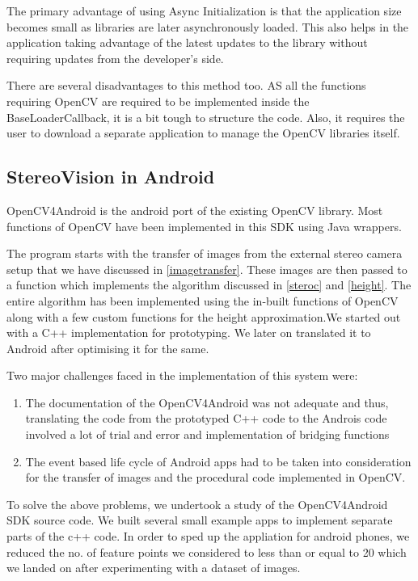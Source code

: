 \documentclass[11pt]{report}
\begin{document}
The primary advantage of using Async Initialization is that the application size becomes small as libraries are later asynchronously loaded. This also helps in the application taking advantage of the latest updates to the library without requiring updates from the developer's side.

There are several disadvantages to this method too. AS all the functions requiring OpenCV are required to be implemented inside the BaseLoaderCallback, it is a bit tough to structure the code. Also, it requires the user to download a separate application to manage the OpenCV libraries itself.

\subsection{StereoVision in Android}

OpenCV4Android is the android port of the existing OpenCV library. Most functions of OpenCV have been implemented in this SDK using Java wrappers. 

The program starts with the transfer of images from the external stereo camera setup that we have discussed in \ref{imagetransfer}. These images are then passed to a function which implements the algorithm discussed in \ref{steroc} and \ref{height}. The entire algorithm has been implemented using the in-built functions of OpenCV along with a few custom functions for the height approximation.We started out with a C++ implementation for prototyping. We later on translated it to Android after optimising it for the same.

Two major challenges faced in the implementation of this system were:

\begin{enumerate}
\item The documentation of the OpenCV4Android was not adequate and thus, translating the code from the prototyped C++ code to the Androis code involved a lot of trial and error and implementation of bridging functions

\item The event based life cycle of Android apps had to be taken into consideration for the transfer of images and the procedural code implemented in OpenCV.
\end{enumerate}

To solve the above problems, we undertook a study of the OpenCV4Android SDK source code. We built several small example apps to implement separate parts of the c++ code. In order to sped up the appliation for android phones, we reduced the no. of feature points we considered to less than or equal to 20 which we landed on after experimenting with a dataset of images. 
\end{document}

